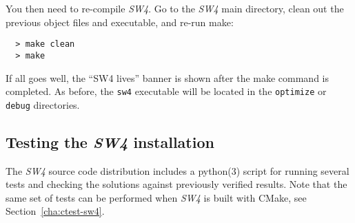 \documentclass[11pt]{article}
\begin{document}
You then need to re-compile \emph{SW4}. Go to the \emph{SW4} main directory, clean out the previous
object files and executable, and re-run make:
\begin{verbatim}
  > make clean
  > make
\end{verbatim}
If all goes well, the ``SW4 lives'' banner is shown after the make command is
completed. As before, the \verb+sw4+ executable will be located in the \verb+optimize+ or
\verb+debug+ directories.

\subsection{Testing the \emph{SW4} installation}
The \emph{SW4} source code distribution includes a python(3) script for running several tests and
checking the solutions against previously verified results. Note that the same set of tests can be
performed when \emph{SW4} is built with CMake, see Section~\ref{cha:ctest-sw4}.
\end{document}
